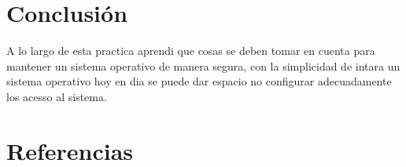 \documentclass[11pt]{article}
\begin{document}
\section{Conclusión}
\label{sec:orgb036a76}
A lo largo de esta practica aprendi que cosas se deben tomar en cuenta para mantener un sistema
operativo de manera segura, con la simplicidad de intara un sistema operativo hoy en dia se puede
dar espacio no configurar adecuadamente los acesso al sistema.

\section{Referencias}
\label{sec:org69b6b90}
\printbibliography[heading=none]
\end{document}
